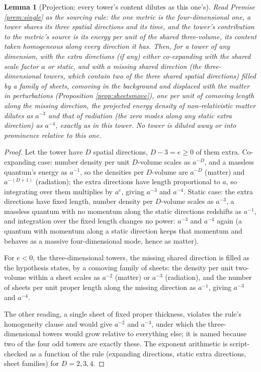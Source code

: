 \documentclass[11pt]{article}
\newtheorem{lemma}[theorem]{Lemma}
\theoremstyle{definition}
\begin{document}
\begin{lemma}[Projection: every tower's content dilutes as this one's]\label{lem:projection}
Read Premise \ref{prem:single} as the sourcing rule: the one metric is the four-dimensional one, a tower shares its three spatial directions and its time, and the tower's contribution to the metric's source is its energy per unit of the shared three-volume, its content taken homogeneous along every direction it has. Then, for a tower of any dimension, with the extra directions (if any) either co-expanding with the shared scale factor $a$ or static, and with a missing shared direction (the three-dimensional towers, which contain two of the three shared spatial directions) filled by a family of sheets, comoving in the background and displaced with the matter in perturbations (Proposition \ref{prop:sheetsmove}), one per unit of comoving length along the missing direction, the projected energy density of non-relativistic matter dilutes as $a^{-3}$ and that of radiation (the zero modes along any static extra direction) as $a^{-4}$, exactly as in this tower. No tower is diluted away or into prominence relative to this one.
\end{lemma}

\begin{proof}
Let the tower have $D$ spatial directions, $D - 3 = e \geq 0$ of them extra. Co-expanding case: number density per unit $D$-volume scales as $a^{-D}$, and a massless quantum's energy as $a^{-1}$, so the densities per $D$-volume are $a^{-D}$ (matter) and $a^{-(D+1)}$ (radiation); the extra directions have length proportional to $a$, so integrating over them multiplies by $a^{e}$, giving $a^{-3}$ and $a^{-4}$. Static case: the extra directions have fixed length, number density per $D$-volume scales as $a^{-3}$, a massless quantum with no momentum along the static directions redshifts as $a^{-1}$, and integration over the fixed length changes no power: $a^{-3}$ and $a^{-4}$ again (a quantum with momentum along a static direction keeps that momentum and behaves as a massive four-dimensional mode, hence as matter).

For $e < 0$, the three-dimensional towers, the missing shared direction is filled as the hypothesis states, by a comoving family of sheets: the density per unit two-volume within a sheet scales as $a^{-2}$ (matter) or $a^{-3}$ (radiation), and the number of sheets per unit proper length along the missing direction as $a^{-1}$, giving $a^{-3}$ and $a^{-4}$.

The other reading, a single sheet of fixed proper thickness, violates the rule's homogeneity clause and would give $a^{-2}$ and $a^{-3}$, under which the three-dimensional towers would grow relative to everything else; it is named because two of the four odd towers are exactly these. The exponent arithmetic is script-checked as a function of the rule (expanding directions, static extra directions, sheet families) for $D = 2, 3, 4$.
\end{proof}
\end{document}
